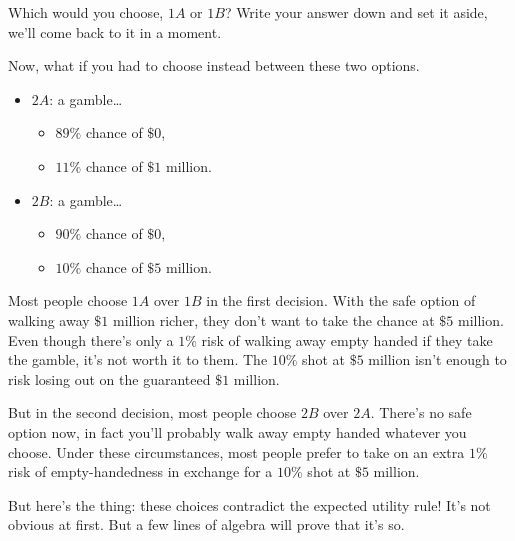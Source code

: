 \documentclass[justified]{tufte-book}
\providecommand{\tightlist}{%
  \setlength{\itemsep}{0pt}\setlength{\parskip}{0pt}}
\theoremstyle{definition}
\theoremstyle{definition}
\theoremstyle{definition}
\theoremstyle{definition}
\theoremstyle{remark}
\begin{document}
Which would you choose, \(1A\) or \(1B\)? Write your answer down and set it aside, we'll come back to it in a moment.

Now, what if you had to choose instead between these two options.

\begin{itemize}
\tightlist
\item
  \(2A\): a gamble\ldots{}

  \begin{itemize}
  \tightlist
  \item
    \(89\%\) chance of \(\$0\),
  \item
    \(11\%\) chance of \(\$1\) million.
  \end{itemize}
\item
  \(2B\): a gamble\ldots{}

  \begin{itemize}
  \tightlist
  \item
    \(90\%\) chance of \(\$0\),
  \item
    \(10\%\) chance of \(\$5\) million.
  \end{itemize}
\end{itemize}

Most people choose \(1A\) over \(1B\) in the first decision. With the safe option of walking away \(\$1\) million richer, they don't want to take the chance at \(\$5\) million. Even though there's only a \(1\%\) risk of walking away empty handed if they take the gamble, it's not worth it to them. The \(10\%\) shot at \(\$5\) million isn't enough to risk losing out on the guaranteed \(\$1\) million.

But in the second decision, most people choose \(2B\) over \(2A\). There's no safe option now, in fact you'll probably walk away empty handed whatever you choose. Under these circumstances, most people prefer to take on an extra \(1\%\) risk of empty-handedness in exchange for a \(10\%\) shot at \(\$5\) million.

But here's the thing: these choices contradict the expected utility rule! It's not obvious at first. But a few lines of algebra will prove that it's so.
\end{document}
